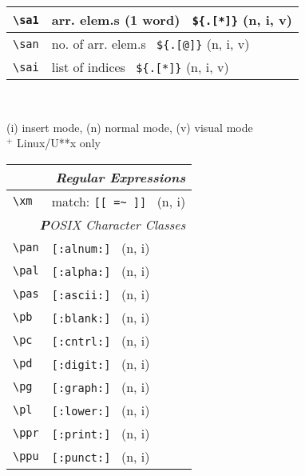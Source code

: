 \documentclass[oneside,12pt,a4paper,DIV18]{scrartcl}
\begin{document}
\begin{center}
\begin{tabular}[]{|p{11mm}|p{59mm}|}
\hline \verb'\sa1' & arr. elem.s (1 word) \ \verb'${.[*]}'    \hfill (n, i, v)\\
\hline \verb'\san' & no. of arr. elem.s \ \verb'${.[@]}'    \hfill (n, i, v)\\
\hline \verb'\sai' & list of indices \ \verb'${.[*]}'    \hfill (n, i, v)\\
\hline
\end{tabular}\\
\begin{flushleft}
{\small
{\normalsize (i)} insert mode, {\normalsize (n)} normal mode, {\normalsize (v)} visual mode\\
$^+$ \footnotesize{Linux/U**x only}
}%
\end{flushleft}

\newpage 
\begin{tabular}[]{|p{11mm}|p{59mm}|}
\hline
\multicolumn{2}{|r|}{\textsl{Regular E\textbf{x}pressions}}\\
\hline \verb'\xm' & match: \verb'[[ =~ ]] '         \hfill (n, i)\\
\hline
\hline
\multicolumn{2}{|r|}{\textsl{\textbf{P}OSIX Character Classes}}\\
\hline \verb'\pan' &  \verb'[:alnum:] '         \hfill (n, i)\\
\hline \verb'\pal' &  \verb'[:alpha:] '         \hfill (n, i)\\
\hline \verb'\pas' &  \verb'[:ascii:] '         \hfill (n, i)\\
\hline \verb'\pb'  &  \verb'[:blank:] '         \hfill (n, i)\\
\hline \verb'\pc'  &  \verb'[:cntrl:] '         \hfill (n, i)\\
\hline \verb'\pd'  &  \verb'[:digit:] '         \hfill (n, i)\\
\hline \verb'\pg'  &  \verb'[:graph:] '         \hfill (n, i)\\
\hline \verb'\pl'  &  \verb'[:lower:] '         \hfill (n, i)\\
\hline \verb'\ppr' &  \verb'[:print:] '         \hfill (n, i)\\
\hline \verb'\ppu' &  \verb'[:punct:] '         \hfill (n, i)\\

\end{tabular}
\end{center}
\end{document}
